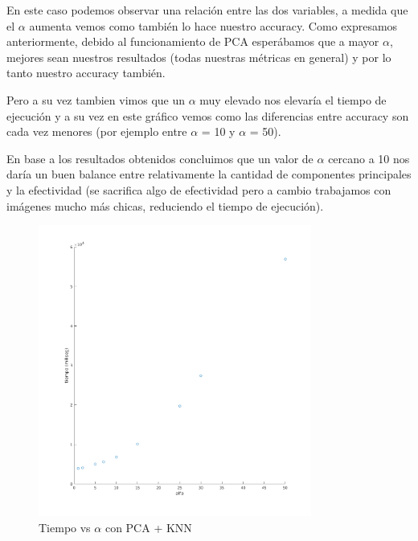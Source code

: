En este caso podemos observar una relación entre las dos variables, a medida que el $\alpha$ aumenta vemos como también lo hace nuestro accuracy.
Como expresamos anteriormente, debido al funcionamiento de PCA esperábamos que a mayor $\alpha$, mejores sean nuestros resultados (todas nuestras métricas en general) y por lo tanto nuestro accuracy también.

Pero a su vez tambien vimos que un $\alpha$ muy elevado  nos elevaría el tiempo de ejecución y a su vez en este gráfico vemos como las diferencias entre accuracy son cada vez menores (por ejemplo entre $\alpha$ = 10 y $\alpha$ = 50).

En base a los resultados obtenidos concluimos que un valor de $\alpha$ cercano a 10 nos daría un buen balance entre relativamente la cantidad de componentes principales y la efectividad (se sacrifica algo de efectividad pero a cambio trabajamos con imágenes mucho más chicas, reduciendo el tiempo de ejecución).


\begin{figure}[H]
	\centering	\includegraphics[width=0.8\textwidth]{img/alfa_pca_tiempo.png}
	\caption{Tiempo vs $\alpha$ con PCA + KNN}
	\label{fig:Tiempo vs Alpha con PCA + KNN}
\end{figure}

